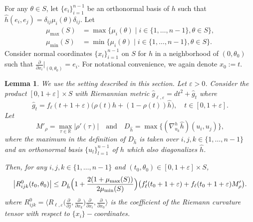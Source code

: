 \documentclass[JEP,XML,SOM,Unicode,NoFloatCountersInSection]{cedram}
\let\sep\mid
\newtheorem{lemma}[theorem]{Lemma}
\theoremstyle{definition}
\let\eps\varepsilon
\renewcommand{\>}{{\rangle}}
\newcommand{\<}{{\langle}}
\begin{document}
For any $\theta\in S$, let $\{e_i\}_{i=1}^{n-1}$ be an orthonormal basis of $h$ such that $\hat h(e_i,e_j)=\delta_{ij}\mu_i(\theta)\delta_{ij}$. Let
\begin{align*}
\mu_{\max}(S) &= \max\{\mu_i(\theta)\sep i\in\{1,\ldots, n-1\}, \theta\in S\},\\
\mu_{\min}(S) &= \min\{\mu_i(\theta)\sep i\in\{1,\ldots, n-1\}, \theta\in S\}.
\end{align*}
Consider normal coordinates $\{x_i\}_{i=1}^{n-1}$ on $S$ for $h$ in a neighborhood of $(0,\theta_0)$ such that $\frac{\partial}{\partial x_i}|_{(0,\theta_0)}=e_i.$ For notational convenience, we again denote $x_0:=t$.

\begin{lemma}\label{lem: bdd_curv_tensor_C3}
We use the setting described in this section. Let $\eps>0$. Consider the product $[0,1+\eps]\times S$ with Riemannian metric $\hat g_{\ell,\eps}=dt^2+\hat g_t$ where
\[
\hat g_t=f_\ell(t+1+\eps) \bigl(\rho(t)h+(1-\rho(t))\hat h \bigr),\quad t\in[0,1+\eps].
\]
Let
\begin{equation}\label{M_rho and D_h}
M'_{\rho} = \max_{\tau\in\mathbb R}|\rho'(\tau)|
\quad \text{and} \quad D_{\hat h} = \max\bigl\{(\nabla^h_{u_k}\hat h)(u_i,u_j)\bigr\},
\end{equation}
where the maximum in the definition of $D_{\hat h}$ is taken over $i,j,k\in\{1,\ldots, n-1\}$ and an orthonormal basis $\{u_l\}_{l=1}^{n-1}$ of $h$ which also diagonalizes $\hat h$.

Then, for any $i,j,k\in\{1,\ldots,n-1\}$ and $(t_0,\theta_0)\in[0,1+\eps]\times S$,
\begin{equation*}
\left|R^0_{ijk}(t_0,\theta_0)\right|\leq D_{\hat h}\Bigl(1+\frac{2(1+\mu_{\max}(S))}{2\mu_{\min}(S)}\Bigr) \bigl(f'_\ell(t_0+1+\eps)+f_\ell(t_0+1+\eps)M'_\rho \bigr).
\end{equation*}
where $R^0_{ijk} = \bigl\langle R_{\ell,\eps} \bigl(\frac{\partial}{\partial j},\frac{\partial}{\partial x_k} \bigr)\frac{\partial}{\partial x_i},\frac{\partial}{\partial x_0} \bigr\rangle$ is the coefficient of the Riemann curvature tensor with respect to $\{x_i\}-$coordinates.
\end{lemma}
\end{document}

